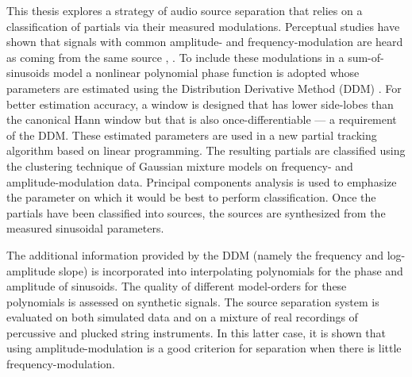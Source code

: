 This thesis explores a strategy of audio source separation that relies on a
classification of partials via their measured modulations. Perceptual studies
have shown that signals with common amplitude\hyp{} and
frequency\hyp{}modulation are heard as coming from the same source
\cite{mcadams1989segregation}, \cite{marin1991segregation}. To include these
modulations in a sum-of-sinusoids model a nonlinear polynomial phase function
is adopted whose parameters are estimated using the Distribution Derivative
Method (DDM) \cite{betser2009sinusoidal}. For better estimation accuracy, a
window is designed that has lower side-lobes than the canonical Hann window but
that is also once-differentiable --- a requirement of the DDM. These estimated
parameters are used in a new partial tracking algorithm based on linear
programming. The resulting partials are classified using the clustering
technique of Gaussian mixture models \cite{friedman2001elements} on frequency-
and amplitude-modulation data. Principal components analysis is used to
emphasize the parameter on which it would be best to perform classification.
Once the partials have been classified into sources, the sources are synthesized
from the measured sinusoidal parameters.

The additional information provided by the DDM (namely the frequency and
log-amplitude slope) is incorporated into interpolating polynomials for the
phase and amplitude of sinusoids. The quality of different model-orders for
these polynomials is assessed on synthetic signals. The source separation system
is evaluated on both simulated data and on a mixture of real recordings of
percussive and plucked string instruments. In this latter case, it is shown that
using amplitude-modulation is a good criterion for separation when there is
little frequency-modulation.
